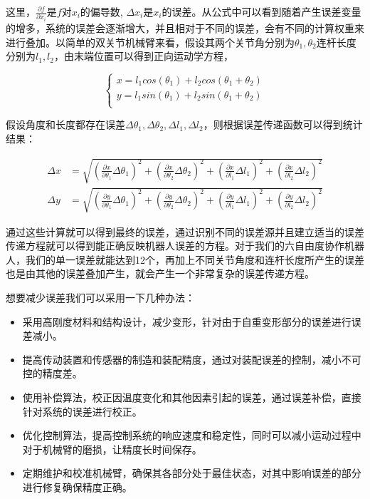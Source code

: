 这里，$\frac{\partial f}{\partial x_i}$是$f$对$x_i$的偏导数, $\Delta x_i$是$x_i$的误差。从公式中可以看到随着产生误差变量的增多，系统的误差会逐渐增大，并且相对于不同的误差，会有不同的计算权重来进行叠加。以简单的双关节机械臂来看，假设其两个关节角分别为$\theta_1,\theta_2$连杆长度分别为$l_1,l_2$，由末端位置可以得到正向运动学方程，

\begin{equation}
    \left\{ \begin{array}{c}	x=l_1cos\left( \theta _1 \right) +l_2cos\left( \theta _1+\theta _2 \right)\\	y=l_1sin\left( \theta _1 \right) +l_2sin\left( \theta _1+\theta _2 \right)\\\end{array} \right. 
\end{equation}

假设角度和长度都存在误差$\Delta\theta_1,\Delta\theta_2,\Delta l_1,\Delta l_2$，则根据误差传递函数可以得到统计结果：

\begin{equation}
    \begin{aligned}
    \varDelta x &=\sqrt{\left( \frac{\partial x}{\partial \theta _1}\Delta \theta _1 \right) ^2+\left( \frac{\partial x}{\partial \theta _2}\Delta \theta _2 \right) ^2+\left( \frac{\partial x}{\partial l_1}\Delta l_1 \right) ^2+\left( \frac{\partial x}{\partial l_2}\Delta l_2 \right) ^2}\\
    \varDelta y &=\sqrt{\left( \frac{\partial y}{\partial \theta _1}\Delta \theta _1 \right) ^2+\left( \frac{\partial y}{\partial \theta _2}\Delta \theta _2 \right) ^2+\left( \frac{\partial y}{\partial l_1}\Delta l_1 \right) ^2+\left( \frac{\partial y}{\partial l_2}\Delta l_2 \right) ^2}
    \end{aligned}
\end{equation}

通过这些计算就可以得到最终的误差，通过识别不同的误差源并且建立适当的误差传递方程就可以得到能正确反映机器人误差的方程。对于我们的六自由度协作机器人，我们的单一误差就能达到12个，再加上不同关节角度和连杆长度所产生的误差也是由其他的误差叠加产生，就会产生一个非常复杂的误差传递方程。

想要减少误差我们可以采用一下几种办法：

\begin{itemize}
    \item 采用高刚度材料和结构设计，减少变形，针对由于自重变形部分的误差进行误差减小。
    \item 提高传动装置和传感器的制造和装配精度，通过对装配误差的控制，减小不可控的精度差。
    \item 使用补偿算法，校正因温度变化和其他因素引起的误差，通过误差补偿，直接针对系统的误差进行校正。
    \item 优化控制算法，提高控制系统的响应速度和稳定性，同时可以减小运动过程中对于机械臂的磨损，让精度长时间保存。
    \item 定期维护和校准机械臂，确保其各部分处于最佳状态，对其中影响误差的部分进行修复确保精度正确。
\end{itemize}

